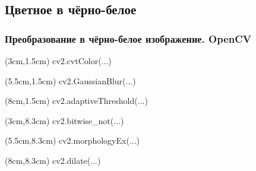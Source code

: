 \documentclass{beamer}
\begin{document}
\subsection{Цветное в чёрно-белое}
\begin{frame}
\frametitle{Преобразование в чёрно-белое изображение. OpenCV}
\begin{center}
\end{center}

\begin{textblock*}{1.5cm}(3cm,1.5cm)
\tiny cv2.cvtColor(...)
\end{textblock*}

\begin{textblock*}{1.5cm}(5.5cm,1.5cm)
\tiny cv2.GaussianBlur(...)
\end{textblock*}

\begin{textblock*}{1.5cm}(8cm,1.5cm)
\tiny cv2.adaptiveThreshold(...)
\end{textblock*}

\begin{textblock*}{1.5cm}(3cm,8.3cm)
\tiny cv2.bitwise\_not(...)
\end{textblock*}

\begin{textblock*}{1.5cm}(5.5cm,8.3cm)
\tiny cv2.morphologyEx(...)
\end{textblock*}

\begin{textblock*}{1.5cm}(8cm,8.3cm)
\tiny cv2.dilate(...)
\end{textblock*}


\end{frame}
\end{document}
